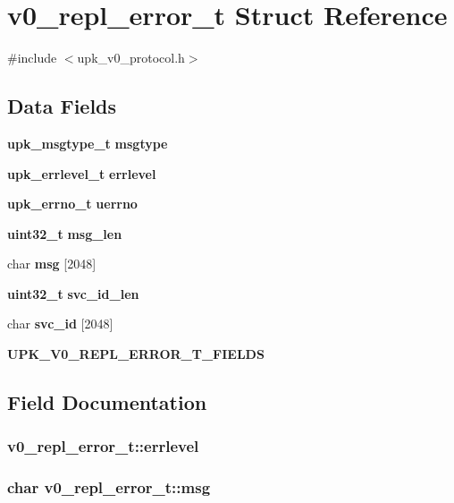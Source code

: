 \section{v0\_\-repl\_\-error\_\-t Struct Reference}
\label{structv0__repl__error__t}


{\ttfamily \#include $<$upk\_\-v0\_\-protocol.h$>$}

\subsection*{Data Fields}
\begin{DoxyCompactItemize}
\item 
{\bf upk\_\-msgtype\_\-t} {\bf msgtype}
\item 
{\bf upk\_\-errlevel\_\-t} {\bf errlevel}
\item 
{\bf upk\_\-errno\_\-t} {\bf uerrno}
\item 
{\bf uint32\_\-t} {\bf msg\_\-len}
\item 
char {\bf msg} [2048]
\item 
{\bf uint32\_\-t} {\bf svc\_\-id\_\-len}
\item 
char {\bf svc\_\-id} [2048]
\item 
{\bf UPK\_\-V0\_\-REPL\_\-ERROR\_\-T\_\-FIELDS}
\end{DoxyCompactItemize}


\subsection{Field Documentation}
\subsubsection[{errlevel}]{ {\bf v0\_\-repl\_\-error\_\-t::errlevel}}\label{structv0__repl__error__t_a587818ee995d5512a3b56d11acfc8341}
\subsubsection[{msg}]{\setlength{\rightskip}{0pt plus 5cm}char {\bf v0\_\-repl\_\-error\_\-t::msg}}\label{structv0__repl__error__t_aa6a97367e747ffb329208491ba91fb5e}
